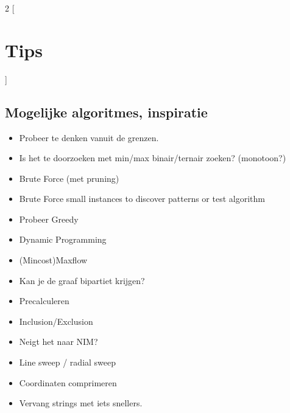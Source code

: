 \documentclass[10pt,a4paper,titlepage]{article}
\begin{document}
\begin{multicols}{2}
[
\section{Tips}
]
\subsection{Mogelijke algoritmes, inspiratie}
\begin{itemize}[noitemsep,nolistsep]
\item Probeer te denken vanuit de grenzen. 
\item Is het te doorzoeken met min/max binair/ternair zoeken? (monotoon?)
\item Brute Force (met pruning)
\item Brute Force small instances to discover patterns or test algorithm
\item Probeer Greedy
\item Dynamic Programming
\item (Mincost)Maxflow
\item Kan je de graaf bipartiet krijgen?
\item Precalculeren
\item Inclusion/Exclusion
\item Neigt het naar NIM?
\item Line sweep / radial sweep
\item Coordinaten comprimeren
\item Vervang strings met iets snellers.
\end{itemize}
\end{multicols}
\end{document}

